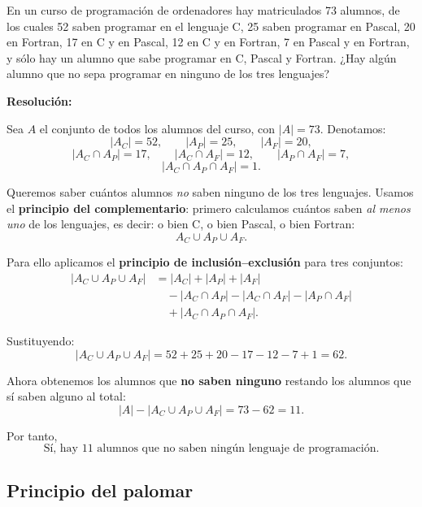 \documentclass[a4paper,12pt]{article}
\begin{document}
\begin{ejercicio}[title=Ejercicio 13]
En un curso de programación de ordenadores hay matriculados 73 alumnos, de los cuales 52 saben programar en el lenguaje C, 25 saben programar en Pascal, 20 en Fortran, 17 en C y en Pascal, 12 en C y en Fortran, 7 en Pascal y en Fortran, y sólo hay un alumno que sabe programar en C, Pascal y Fortran. ¿Hay algún alumno que no sepa programar en ninguno de los tres lenguajes?

\tcblower
\textbf{Resolución:}

Sea $A$ el conjunto de todos los alumnos del curso, con $|A|=73$. Denotamos:
\[
|A_C|=52,\qquad |A_P|=25,\qquad |A_F|=20,
\]
\[
|A_C \cap A_P| = 17,\qquad |A_C \cap A_F|=12,\qquad |A_P \cap A_F|=7,
\]
\[
|A_C \cap A_P \cap A_F| = 1.
\]

Queremos saber cuántos alumnos \emph{no} saben ninguno de los tres lenguajes.  
Usamos el \textbf{principio del complementario}: primero calculamos cuántos saben \emph{al menos uno} de los lenguajes, es decir: o bien C, o bien Pascal, o bien Fortran:
\[
A_C \cup A_P \cup A_F.
\]

Para ello aplicamos el \textbf{principio de inclusión–exclusión} para tres conjuntos:
\[
\begin{aligned}
|A_C \cup A_P \cup A_F|
&= |A_C| + |A_P| + |A_F|
\\[2pt]
&\quad - |A_C \cap A_P| - |A_C \cap A_F| - |A_P \cap A_F|
\\[2pt]
&\quad + |A_C \cap A_P \cap A_F|.
\end{aligned}
\]

Sustituyendo:
\[
|A_C \cup A_P \cup A_F|
= 52 + 25 + 20 - 17 - 12 - 7 + 1 = 62.
\]

Ahora obtenemos los alumnos que \textbf{no saben ninguno} restando los alumnos que sí saben alguno al total:
\[
|A| - |A_C \cup A_P \cup A_F| = 73 - 62 = \boxed{11}.
\]

Por tanto,
\[
\boxed{\text{Sí, hay 11 alumnos que no saben ningún lenguaje de programación.}}
\]

\end{ejercicio}

\subsection{Principio del palomar}
\end{document}
